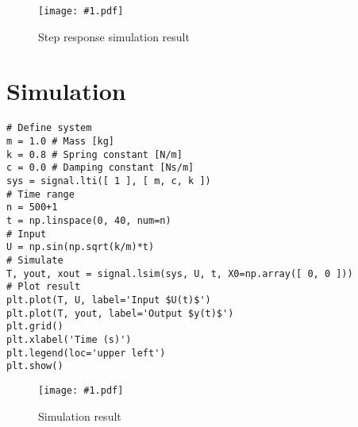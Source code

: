 \documentclass[a4paper,12pt]{article}
\newcommand{\Fig}[3]{%
	\begin{figure}[htb]%
	\begin{center}%
	\texttt{[image: \#1.pdf]}%
	\end{center}%
	\caption{#3\label{fig:#1}}%
	\end{figure}%
	}
\newcommand{\Section}[2]{\section{#2}\label{section:#1}}
\begin{document}
\Fig{step}{0.7}{Step response simulation result}

\Section{simulate}{Simulation}



\begin{verbatim}
# Define system
m = 1.0 # Mass [kg]
k = 0.8 # Spring constant [N/m]
c = 0.0 # Damping constant [Ns/m]
sys = signal.lti([ 1 ], [ m, c, k ])
# Time range
n = 500+1
t = np.linspace(0, 40, num=n)
# Input
U = np.sin(np.sqrt(k/m)*t)
# Simulate
T, yout, xout = signal.lsim(sys, U, t, X0=np.array([ 0, 0 ]))
# Plot result
plt.plot(T, U, label='Input $U(t)$')
plt.plot(T, yout, label='Output $y(t)$')
plt.grid()
plt.xlabel('Time (s)')
plt.legend(loc='upper left')
plt.show()
\end{verbatim}

\Fig{simulate}{0.7}{Simulation result}

\end{document}
